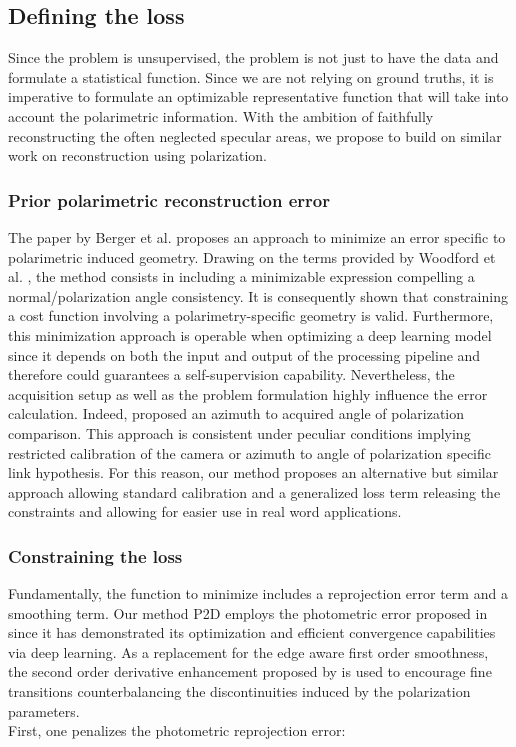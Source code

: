 \subsection{Defining the loss}

Since the problem is unsupervised, the problem is not just to have the data and formulate a statistical function. Since we are not relying on ground truths, it is imperative to formulate an optimizable representative function that will take into account the polarimetric information. With the ambition of faithfully reconstructing the often neglected specular areas, we propose to build on similar work on reconstruction using polarization.

\subsubsection{Prior polarimetric reconstruction error}

The paper by Berger et al. \cite{berger2017depth} proposes an approach to minimize an error specific to polarimetric induced geometry. Drawing on the terms provided by Woodford et al. \cite{Woodford2008GlobalPriors}, the method consists in including a minimizable expression compelling a normal/polarization angle consistency.
It is consequently shown that constraining a cost function involving a polarimetry-specific geometry is valid. Furthermore, this minimization approach is operable when optimizing a deep learning model since it depends on both the input and output of the processing pipeline and therefore could guarantees a self-supervision capability. Nevertheless, the acquisition setup as well as the problem formulation highly influence the error calculation. Indeed, \cite{berger2017depth} proposed an azimuth to acquired angle of polarization comparison. This approach is consistent under peculiar conditions implying restricted calibration of the camera or azimuth to angle of polarization specific link hypothesis. For this reason, our method proposes an alternative but similar approach allowing standard calibration and a generalized loss term releasing the constraints and allowing for easier use in real word applications.


\subsubsection{Constraining the loss}

Fundamentally, the function to minimize includes a reprojection error term and a smoothing term. Our method P2D employs the photometric error proposed in~\cite{godard2019digging} since it has demonstrated its optimization and efficient convergence capabilities via deep learning. As a replacement for the edge aware first order smoothness, the second order derivative enhancement proposed by \cite{Woodford2008GlobalPriors} is used to encourage fine transitions counterbalancing the discontinuities induced by the polarization parameters.\\ 
First, one penalizes the photometric reprojection error:


